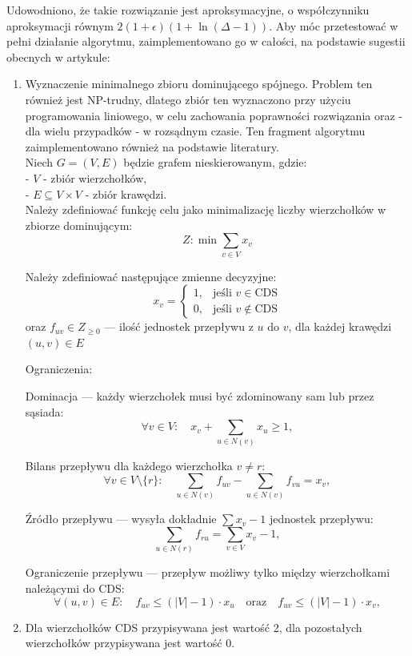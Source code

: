 Udowodniono, że takie rozwiązanie jest aproksymacyjne, o współczynniku aproksymacji równym
$2(1+\epsilon)(1 + \ln(\Delta - 1))$. Aby móc przetestować w pełni działanie algorytmu, zaimplementowano go w całości, na podstawie sugestii obecnych w artykule:

\begin{enumerate}
    \item Wyznaczenie minimalnego zbioru dominującego spójnego. Problem ten również jest NP-trudny, dlatego zbiór ten wyznaczono przy użyciu programowania liniowego, w celu zachowania poprawności rozwiązania oraz - dla wielu przypadków - w rozsądnym czasie. Ten fragment algorytmu zaimplementowano również na podstawie literatury\cite{CDS}.\\ 
    Niech \( G = (V, E) \) będzie grafem nieskierowanym, gdzie:\\
        - \( V \) - zbiór wierzchołków,\\
        - \( E \subseteq V \times V \) - zbiór krawędzi.\\

        Należy zdefiniować funkcję celu jako minimalizację liczby wierzchołków w zbiorze dominującym:
        \[
        Z: \min \sum_{v \in V} x_v
        \]

        Należy zdefiniować następujące zmienne decyzyjne:
        \[
        x_v =
        \begin{cases}
        1, & \text{jeśli } v \in \text{CDS} \\
        0, & \text{jeśli } v \notin \text{CDS}
        \end{cases}
        \]
        oraz \( f_{uv} \in {Z}_{\geq 0} \) — ilość jednostek przepływu z \( u \) do \( v \), dla każdej krawędzi \( (u, v) \in E \)

        Ograniczenia:

        Dominacja — każdy wierzchołek musi być zdominowany sam lub przez sąsiada:
        \[
        \forall v \in V:\quad x_v + \sum_{u \in N(v)} x_u \geq 1, \tag{1}
        \]

        Bilans przepływu dla każdego wierzchołka \( v \neq r \):
        \[
        \forall v \in V \setminus \{r\}:\quad \sum_{u \in N(v)} f_{uv} - \sum_{u \in N(v)} f_{vu} = x_v, \tag{2}
        \]

        Źródło przepływu — wysyła dokładnie \( \sum x_v - 1 \) jednostek przepływu:
        \[
        \sum_{u \in N(r)} f_{ru} = \sum_{v \in V} x_v - 1, \tag{3}
        \]

        Ograniczenie przepływu — przepływ możliwy tylko między wierzchołkami należącymi do CDS:
        \[
        \forall (u, v) \in E:\quad f_{uv} \leq (|V| - 1) \cdot x_u \quad \text{oraz} \quad f_{uv} \leq (|V| - 1) \cdot x_v, \tag{4}
        \]
    \item Dla wierzchołków CDS przypisywana jest wartość 2, dla pozostałych wierzchołków przypisywana jest wartość 0.
\end{enumerate}

